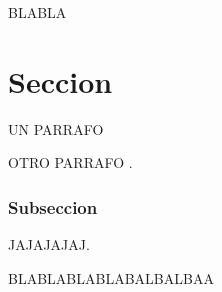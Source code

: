 BLABLA
\section{Seccion}
UN PARRAFO
\\ \par 
OTRO PARRAFO \cite{mitchell}.
\\ \par

\subsubsection{Subseccion}


JAJAJAJAJ.
\\ \par
BLABLABLABLABALBALBAA
\\ \par




